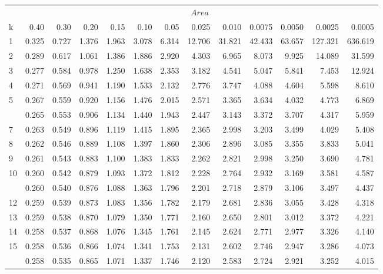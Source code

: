 \documentclass[
]{article}
\begin{document}
\begin{longtable}[t]{lrrrrrrrrrrrr}
\toprule
\multicolumn{1}{c}{ } & \multicolumn{12}{c}{$Area$} \\
\cmidrule(l{3pt}r{3pt}){2-13}
k & 0.40 & 0.30 & 0.20 & 0.15 & 0.10 & 0.05 & 0.025 & 0.010 & 0.0075 & 0.0050 & 0.0025 & 0.0005\\
\midrule
1 & 0.325 & 0.727 & 1.376 & 1.963 & 3.078 & 6.314 & 12.706 & 31.821 & 42.433 & 63.657 & 127.321 & 636.619\\
2 & 0.289 & 0.617 & 1.061 & 1.386 & 1.886 & 2.920 & 4.303 & 6.965 & 8.073 & 9.925 & 14.089 & 31.599\\
3 & 0.277 & 0.584 & 0.978 & 1.250 & 1.638 & 2.353 & 3.182 & 4.541 & 5.047 & 5.841 & 7.453 & 12.924\\
4 & 0.271 & 0.569 & 0.941 & 1.190 & 1.533 & 2.132 & 2.776 & 3.747 & 4.088 & 4.604 & 5.598 & 8.610\\
5 & 0.267 & 0.559 & 0.920 & 1.156 & 1.476 & 2.015 & 2.571 & 3.365 & 3.634 & 4.032 & 4.773 & 6.869\\
\addlinespace
6 & 0.265 & 0.553 & 0.906 & 1.134 & 1.440 & 1.943 & 2.447 & 3.143 & 3.372 & 3.707 & 4.317 & 5.959\\
7 & 0.263 & 0.549 & 0.896 & 1.119 & 1.415 & 1.895 & 2.365 & 2.998 & 3.203 & 3.499 & 4.029 & 5.408\\
8 & 0.262 & 0.546 & 0.889 & 1.108 & 1.397 & 1.860 & 2.306 & 2.896 & 3.085 & 3.355 & 3.833 & 5.041\\
9 & 0.261 & 0.543 & 0.883 & 1.100 & 1.383 & 1.833 & 2.262 & 2.821 & 2.998 & 3.250 & 3.690 & 4.781\\
10 & 0.260 & 0.542 & 0.879 & 1.093 & 1.372 & 1.812 & 2.228 & 2.764 & 2.932 & 3.169 & 3.581 & 4.587\\
\addlinespace
11 & 0.260 & 0.540 & 0.876 & 1.088 & 1.363 & 1.796 & 2.201 & 2.718 & 2.879 & 3.106 & 3.497 & 4.437\\
12 & 0.259 & 0.539 & 0.873 & 1.083 & 1.356 & 1.782 & 2.179 & 2.681 & 2.836 & 3.055 & 3.428 & 4.318\\
13 & 0.259 & 0.538 & 0.870 & 1.079 & 1.350 & 1.771 & 2.160 & 2.650 & 2.801 & 3.012 & 3.372 & 4.221\\
14 & 0.258 & 0.537 & 0.868 & 1.076 & 1.345 & 1.761 & 2.145 & 2.624 & 2.771 & 2.977 & 3.326 & 4.140\\
15 & 0.258 & 0.536 & 0.866 & 1.074 & 1.341 & 1.753 & 2.131 & 2.602 & 2.746 & 2.947 & 3.286 & 4.073\\
\addlinespace
16 & 0.258 & 0.535 & 0.865 & 1.071 & 1.337 & 1.746 & 2.120 & 2.583 & 2.724 & 2.921 & 3.252 & 4.015\\

\end{longtable}
\end{document}
